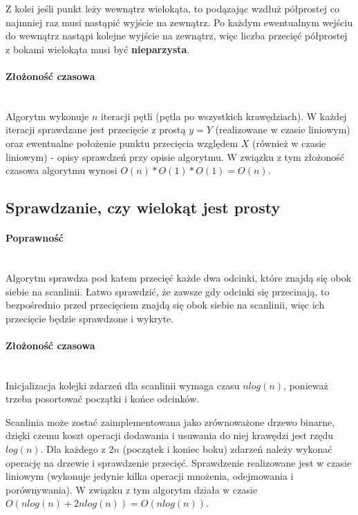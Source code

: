 \documentclass{article}
\begin{document}
Z kolei jeśli punkt leży wewnątrz wielokąta, to podązając wzdłuż półprostej co najmniej raz musi nastąpić wyjście na zewnątrz. Po każdym ewentualnym wejściu do wewnątrz nastąpi kolejne wyjście na zewnątrz, więc liczba przecięć półprostej z bokami wielokąta musi być \textbf{nieparzysta}.

\paragraph{Złożoność czasowa} \mbox{}\\
Algorytm wykonuje $n$ iteracji pętli (pętla po wszystkich krawędziach). W każdej iteracji sprawdzane jest przecięcie z prostą $y = Y$ (realizowane w czasie liniowym) oraz ewentualne położenie punktu przecięcia względem $X$ (również w czasie liniowym) - opisy sprawdzeń przy opisie algorytmu. W związku z tym złożoność czasowa algorytmu wynosi $O(n) * O(1) * O(1) = O(n)$.


\subsection{Sprawdzanie, czy wielokąt jest prosty}

\paragraph{Poprawność} \mbox{}\\
Algorytm sprawdza pod katem przecięć każde dwa odcinki, które znajdą się obok siebie na scanlinii. Łatwo sprawdzić, że zawsze gdy odcinki się przecinają, to bezpośrednio przed przecięciem znajdą się obok siebie na scanlinii, więc ich przecięcie będzie sprawdzone i wykryte.

\paragraph{Złożoność czasowa} \mbox{}\\
Inicjalizacja kolejki zdarzeń dla scanlinii wymaga czasu $nlog(n)$, ponieważ trzeba posortować początki i końce odcinków.

Scanlinia może zostać zaimplementowana jako zrównoważone drzewo binarne, dzięki czemu koszt operacji dodawania i usuwania do niej krawędzi jest rzędu $log(n)$. Dla każdego z $2n$ (początek i koniec boku) zdarzeń należy wykonać operację na drzewie i sprawdzenie przecięć. Sprawdzenie realizowane jest w czasie liniowym (wykonuje jedynie kilka operacji mnożenia, odejmowania i porównywania). W związku z tym algorytm działa w czasie $O(nlog(n) + 2nlog(n)) = O(nlog(n))$.
\end{document}
